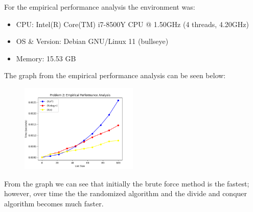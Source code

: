 \documentclass{hw}
\begin{document}
\begin{solution}
For the empirical performance analysis the environment was:
        \begin{itemize}
            \item CPU: Intel(R) Core(TM) i7-8500Y CPU @ 1.50GHz (4 threads, 4.20GHz)
            \item OS \& Version: Debian GNU/Linux 11 (bullseye)
            \item Memory: 15.53 GB
        \end{itemize}
            
        The graph from the empirical performance analysis can be seen below:
\begin{figure}[ht]
  \centering
      \includegraphics[width=0.5\textwidth]{figures/problem-2.png}
\end{figure}
From the graph we can see that initially the brute force method is the fastest; however, over time the the randomized algorithm and the divide and conquer algorithm becomes much faster.
\end{solution}
\newpage
\end{document}
